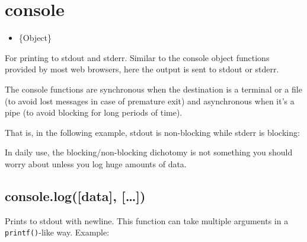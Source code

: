 \section{console}

\begin{Shaded}
\begin{Highlighting}[]
\NormalTok{: } 
\end{Highlighting}
\end{Shaded}

\begin{itemize}
\item
  \{Object\}
\end{itemize}

For printing to stdout and stderr. Similar to the console object
functions provided by most web browsers, here the output is sent to
stdout or stderr.

The console functions are synchronous when the destination is a terminal
or a file (to avoid lost messages in case of premature exit) and
asynchronous when it's a pipe (to avoid blocking for long periods of
time).

That is, in the following example, stdout is non-blocking while stderr
is blocking:

\begin{Shaded}
\begin{Highlighting}[]
 \NormalTok{> } 
\end{Highlighting}
\end{Shaded}

In daily use, the blocking/non-blocking dichotomy is not something you
should worry about unless you log huge amounts of data.

\subsection{console.log({[}data{]}, {[}\ldots{}{]})}

Prints to stdout with newline. This function can take multiple arguments
in a \texttt{printf()}-like way. Example:

\begin{Shaded}
\end{Shaded}

